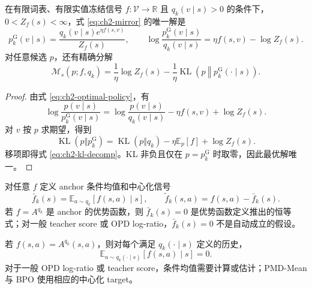 \documentclass[lang=cn,scheme=chinese,openany]{../book/elegantbook}
\begin{document}
\begin{theorem}
\label{thm:ch2-gibbs}
在有限词表、有限实值冻结信号 $f:\mathcal V\to\mathbb R$ 且 $q_k(v\mid s)>0$ 的条件下，$0<Z_f(s)<\infty$，式 \eqref{eq:ch2-mirror} 的唯一解是
\begin{equation}
\label{eq:ch2-optimal-policy}
 p_k^{\mathrm G}(v\mid s)=\frac{ q_k(v\mid s)e^{\eta f(s,v)}}{Z_f(s)},
\qquad
\log\frac{ p_k^{\mathrm G}(v\mid s)}{ q_k(v\mid s)}
=\eta f(s,v)-\log Z_f(s).
\end{equation}
对任意候选 $p$，还有精确分解
\begin{equation}
\label{eq:ch2-kl-decomp}
\mathcal M_s(p;f, q_k)
=\frac1\eta\log Z_f(s)
-\frac1\eta\operatorname{KL}\!\left(p\middle\Vert p_k^{\mathrm G}(\cdot\mid s)\right).
\end{equation}
\end{theorem}

\begin{proof}
由式 \eqref{eq:ch2-optimal-policy}，有
\begin{equation*}
\log\frac{p(v\mid s)}{ p_k^{\mathrm G}(v\mid s)}
=\log\frac{p(v\mid s)}{ q_k(v\mid s)}-\eta f(s,v)+\log Z_f(s).
\end{equation*}
对 $v$ 按 $p$ 求期望，得到
\begin{equation*}
\operatorname{KL}(p\Vert p_k^{\mathrm G})
=\operatorname{KL}(p\Vert q_k)-\eta\mathbb E_p[f]+\log Z_f(s).
\end{equation*}
移项即得式 \eqref{eq:ch2-kl-decomp}。KL 非负且仅在 $p= p_k^{\mathrm G}$ 时取零，因此最优解唯一。
\end{proof}

\begin{definition}
\label{def:ch2-centered-signal}
对任意 $f$ 定义 anchor 条件均值和中心化信号
\begin{equation*}
\bar f_k(s)=\mathbb E_{a\sim q_k}[f(s,a)\mid s],
\qquad
\widetilde f_k(s,a)=f(s,a)-\bar f_k(s).
\end{equation*}
若 $f=A^{ q_k}$ 是 anchor 的优势函数，则 $\bar f_k(s)=0$ 是优势函数定义推出的恒等式；对一般 teacher score 或 OPD log-ratio，$\bar f_k(s)=0$ 不是自动成立的假设。
\end{definition}

\begin{proposition}
\label{prop:ch2-advantage-centering}
若 $f(s,a)=A^{ q_k}(s,a)$，则对每个满足 $ q_k(\cdot\mid s)$ 定义的历史，
\begin{equation}
\label{eq:ch2-advantage-zero-mean}
\mathbb E_{a\sim q_k(\cdot\mid s)}[f(s,a)\mid s]=0.
\end{equation}
对于一般 OPD log-ratio 或 teacher score，条件均值需要计算或估计；PMD-Mean 与 BPO 使用相应的中心化 target。
\end{proposition}
\end{document}
